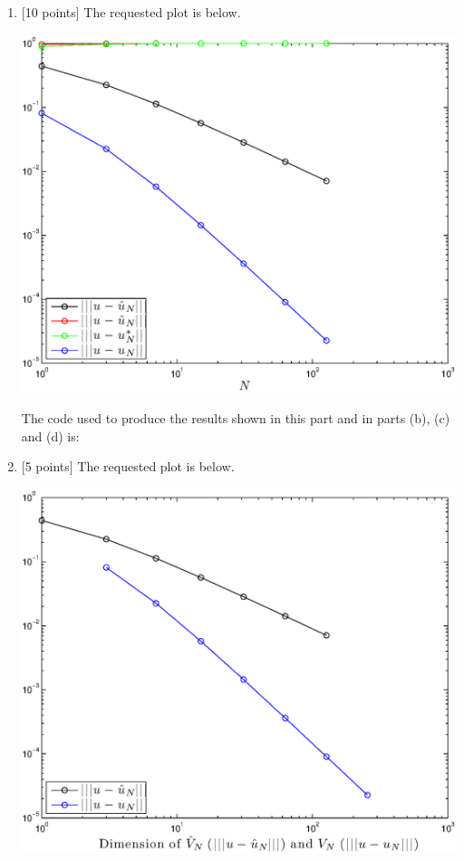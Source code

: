 \begin{solution}
\begin{enumerate}
\item {[10 points]} The requested plot is below.

\begin{center}
\includegraphics[scale=0.75]{hw35a.eps}
\end{center}

The code used to produce the results shown in this part and in parts (b), (c) and (d) is:



\item {[5 points]} The requested plot is below.

\begin{center}
\includegraphics[scale=0.75]{hw35b.eps}
\end{center}


\end{enumerate}
\end{solution}
